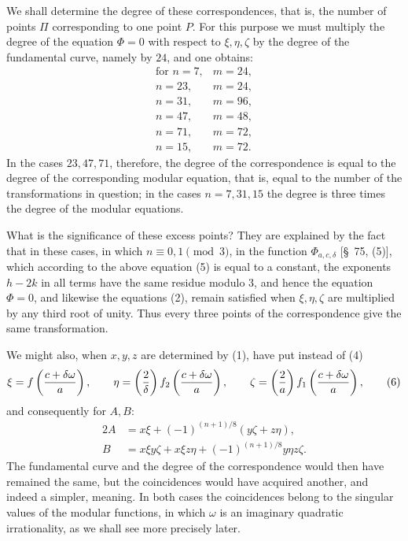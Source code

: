 \documentclass[11pt]{article}
\begin{document}
We shall determine the degree of these correspondences, that is, the number of points $\Pi$ corresponding to one point $P$. For this purpose we must multiply the degree of the equation $\Phi=0$ with respect to $\xi,\eta,\zeta$ by the degree of the fundamental curve, namely by $24$, and one obtains:
\[
\begin{array}{c|c}
\text{for } n=7,&m=24,\\
 n=23,&m=24,\\
 n=31,&m=96,\\
 n=47,&m=48,\\
 n=71,&m=72,\\
 n=15,&m=72.
\end{array}
\]
In the cases $23,47,71$, therefore, the degree of the correspondence is equal to the degree of the corresponding modular equation, that is, equal to the number of the transformations in question; in the cases $n=7,31,15$ the degree is three times the degree of the modular equations.

What is the significance of these excess points? They are explained by the fact that in these cases, in which $n\equiv0,1\pmod 3$, in the function $\Phi_{a,c,\delta}$ [\S~75, (5)], which according to the above equation (5) is equal to a constant, the exponents $h-2k$ in all terms have the same residue modulo $3$, and hence the equation $\Phi=0$, and likewise the equations (2), remain satisfied when $\xi,\eta,\zeta$ are multiplied by any third root of unity. Thus every three points of the correspondence give the same transformation.

We might also, when $x,y,z$ are determined by (1), have put instead of (4)
\begin{equation}
\xi=f\left({c+\delta\omega\over a}\right),\qquad
\eta=\left({2\over\delta}\right)f_2\left({c+\delta\omega\over a}\right),\qquad
\zeta=\left({2\over a}\right)f_1\left({c+\delta\omega\over a}\right),
\tag{6}
\end{equation}
and consequently for $A,B$:
\begin{equation}
\begin{aligned}
2A&=x\xi+(-1)^{(n+1)/8}(y\zeta+z\eta),\\
B&=x\xi y\zeta+x\xi z\eta+(-1)^{(n+1)/8}y\eta z\zeta.
\end{aligned}
\tag{7}
\end{equation}
The fundamental curve and the degree of the correspondence would then have remained the same, but the coincidences would have acquired another, and indeed a simpler, meaning. In both cases the coincidences belong to the singular values of the modular functions, in which $\omega$ is an imaginary quadratic irrationality, as we shall see more precisely later.
\end{document}
